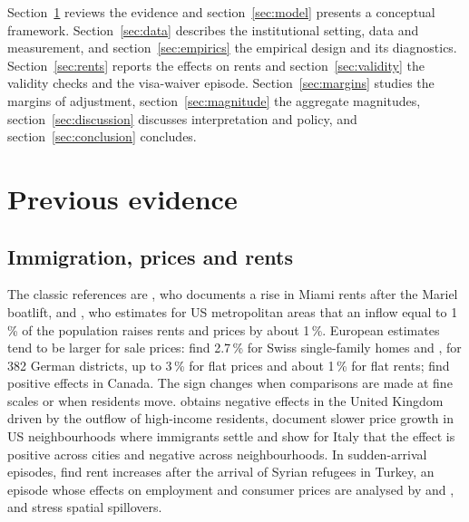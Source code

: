 \documentclass[11pt,a4paper]{article}
\begin{document}
Section~\ref{sec:lit} reviews the evidence and section~\ref{sec:model} presents a conceptual framework. Section~\ref{sec:data} describes the institutional setting, data and measurement, and section~\ref{sec:empirics} the empirical design and its diagnostics. Section~\ref{sec:rents} reports the effects on rents and section~\ref{sec:validity} the validity checks and the visa-waiver episode. Section~\ref{sec:margins} studies the margins of adjustment, section~\ref{sec:magnitude} the aggregate magnitudes, section~\ref{sec:discussion} discusses interpretation and policy, and section~\ref{sec:conclusion} concludes.

\section{Previous evidence}\label{sec:lit}

\subsection{Immigration, prices and rents}

The classic references are \citet{saiz2003}, who documents a rise in Miami rents after the Mariel boatlift, and \citet{saiz2007}, who estimates for US metropolitan areas that an inflow equal to 1\,\% of the population raises rents and prices by about 1\,\%. European estimates tend to be larger for sale prices: \citet{degen2017} find 2.7\,\% for Swiss single-family homes and \citet{unal2026}, for 382 German districts, up to 3\,\% for flat prices and about 1\,\% for flat rents; \citet{akbari2012} find positive effects in Canada. The sign changes when comparisons are made at fine scales or when residents move. \citet{sa2015} obtains negative effects in the United Kingdom driven by the outflow of high-income residents, \citet{saiz2011} document slower price growth in US neighbourhoods where immigrants settle and \citet{accetturo2014} show for Italy that the effect is positive across cities and negative across neighbourhoods. In sudden-arrival episodes, \citet{balkan2018} find rent increases after the arrival of Syrian refugees in Turkey, an episode whose effects on employment and consumer prices are analysed by \citet{tumen2016} and \citet{balkan2016}, and \citet{mussa2017} stress spatial spillovers.
\end{document}
